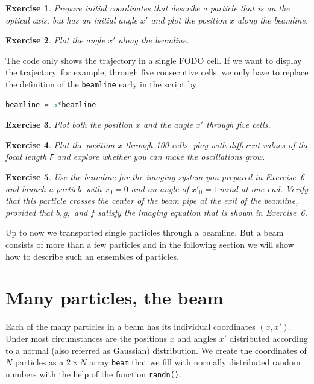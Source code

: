 \documentclass{article}
\newtheorem{exercise}{Exercise}
\begin{document}
\begin{exercise}
Prepare initial coordinates that describe a particle that is on the optical axis, but has an initial angle $x'$ and plot the position $x$ along the beamline.
\end{exercise}

\begin{exercise}
Plot the angle $x'$ along the beamline.
\end{exercise}

The code only shows the trajectory in a single FODO cell. If we want to display the
trajectory, for example, through five consecutive cells, we only have to replace the definition of the {\tt beamline} early in the script by
\begin{lstlisting}[language=Python]
beamline = 5*beamline
\end{lstlisting}

\begin{exercise}
Plot both the position $x$ and the angle $x'$ through five cells.
\end{exercise}

\begin{exercise}
Plot the position $x$ through 100 cells, play with different values of the focal length {\tt F} and explore whether you can make the oscillations grow.
\end{exercise}

\begin{exercise}
Use the beamline for the imaging system you prepared in Exercise~6 and launch a particle with $x_0=0$ and an angle of $x'_0=1\,$mrad at one end. Verify that this particle crosses the center of the beam pipe at the exit of the beamline, provided that $b,g,$ and $f$ satisfy the imaging equation that is shown in Exercise~6. 
\end{exercise}
Up to now we transported single particles through a beamline. But
a beam consists of more than a few particles and in the following section we will show how to describe such an ensembles of particles.
%
\section{Many particles, the beam}
%
Each of the many particles in a beam has its individual coordinates $(x,x').$ Under 
most circumstances are the positions $x$ and angles $x'$ distributed according to a normal (also referred as Gaussian) distribution. We create the coordinates of $N$ particles as a $2\times N$
array {\tt beam} that we fill with normally distributed random numbers with the 
help of the function {\tt randn()}. 
\end{document}
